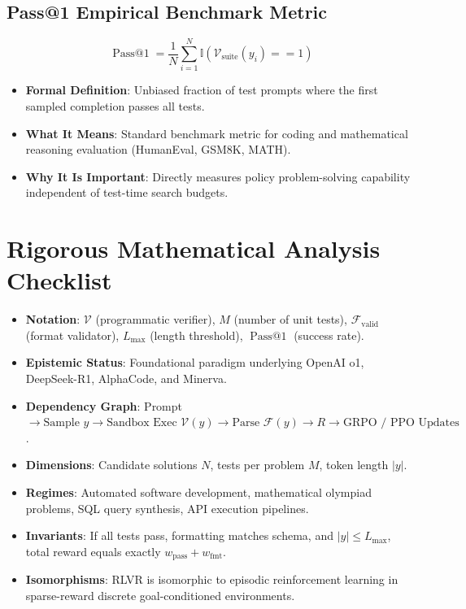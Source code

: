 \documentclass[11pt,a4paper]{article}
\theoremstyle{definition}
\begin{document}
\subsection{Pass@1 Empirical Benchmark Metric}
{\boldmath
\begin{equation}
\operatorname{Pass@1} = \frac{1}{N}\sum_{i=1}^N \mathbb{I}\left( \mathcal{V}_{\text{suite}}(y_i) == 1 \right)
\end{equation}
}
\begin{itemize}
    \item \textbf{Formal Definition}: Unbiased fraction of test prompts where the first sampled completion passes all tests.
    \item \textbf{What It Means}: Standard benchmark metric for coding and mathematical reasoning evaluation (HumanEval, GSM8K, MATH).
    \item \textbf{Why It Is Important}: Directly measures policy problem-solving capability independent of test-time search budgets.
\end{itemize}

\section{Rigorous Mathematical Analysis Checklist}

\begin{itemize}
    \item \textbf{Notation}: $\mathcal{V}$ (programmatic verifier), $M$ (number of unit tests), $\mathcal{F}_{\text{valid}}$ (format validator), $L_{\max}$ (length threshold), $\operatorname{Pass@1}$ (success rate).
    \item \textbf{Epistemic Status}: Foundational paradigm underlying OpenAI o1, DeepSeek-R1, AlphaCode, and Minerva.
    \item \textbf{Dependency Graph}: Prompt $\to \text{Sample } y \to \text{Sandbox Exec } \mathcal{V}(y) \to \text{Parse } \mathcal{F}(y) \to R \to \text{GRPO / PPO Updates}$.
    \item \textbf{Dimensions}: Candidate solutions $N$, tests per problem $M$, token length $|y|$.
    \item \textbf{Regimes}: Automated software development, mathematical olympiad problems, SQL query synthesis, API execution pipelines.
    \item \textbf{Invariants}: If all tests pass, formatting matches schema, and $|y| \le L_{\max}$, total reward equals exactly $w_{\text{pass}} + w_{\text{fmt}}$.
    \item \textbf{Isomorphisms}: RLVR is isomorphic to episodic reinforcement learning in sparse-reward discrete goal-conditioned environments.
\end{itemize}
\end{document}

